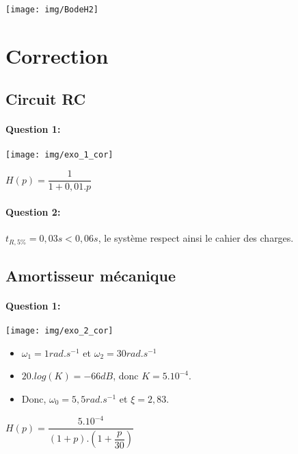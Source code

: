 \begin{center}
 \texttt{[image: img/BodeH2]}
\end{center}

\ifdef{\public}{}{}

\newpage

\pagestyle{correction}

\section{Correction}

\subsection{Circuit RC}

\paragraph{Question 1:}

\begin{center}
 \texttt{[image: img/exo\_1\_cor]}
\end{center}

$H(p)=\dfrac{1}{1+0,01.p}$

\paragraph{Question 2:}

$t_{R,5\%}=0,03s<0,06s$, le système respect ainsi le cahier des charges.

\subsection{Amortisseur mécanique}

\paragraph{Question 1:}

\begin{center}
 \texttt{[image: img/exo\_2\_cor]}
\end{center}

\begin{minipage}{0.5\linewidth}
\begin{itemize}
 \item $\omega_1=1rad.s^{-1}$ et $\omega_2=30rad.s^{-1}$
 \item $20.log(K)=-66dB$, donc $K=5.10^{-4}$.
 \item Donc, $\omega_0=5,5rad.s^{-1}$ et $\xi=2,83$.
\end{itemize}
\end{minipage}\hfill
\begin{minipage}{0.4\linewidth}
$H(p)=\dfrac{5.10^{-4}}{(1+p).(1+\dfrac{p}{30})}$
\end{minipage}

